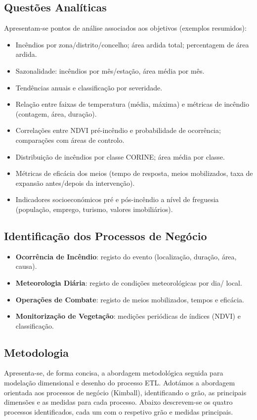 \subsection{Questões Analíticas}
Apresentam-se pontos de análise associados aos objetivos (exemplos resumidos):
\begin{itemize}
	\item Incêndios por zona/distrito/concelho; área ardida total; percentagem de área ardida.
	\item Sazonalidade: incêndios por mês/estação, área média por mês.
	\item Tendências anuais e classificação por severidade.
	\item Relação entre faixas de temperatura (média, máxima) e métricas de incêndio (contagem, área, duração).
	\item Correlações entre NDVI pré-incêndio e probabilidade de ocorrência; comparações com áreas de controlo.
	\item Distribuição de incêndios por classe CORINE; área média por classe.
	\item Métricas de eficácia dos meios (tempo de resposta, meios mobilizados, taxa de expansão antes/depois da intervenção).
	\item Indicadores socioeconómicos pré e pós-incêndio a nível de freguesia (população, emprego, turismo, valores imobiliários).
\end{itemize}

\subsection{Identificação dos Processos de Negócio}
\begin{itemize}
	\item \textbf{Ocorrência de Incêndio}: registo do evento (localização, duração, área, causa).
	\item \textbf{Meteorologia Diária}: registo de condições meteorológicas por dia/ local.
	\item \textbf{Operações de Combate}: registo de meios mobilizados, tempos e eficácia.
	\item \textbf{Monitorização de Vegetação}: medições periódicas de índices (NDVI) e classificação.
\end{itemize}
\subsection{Metodologia}
Apresenta-se, de forma concisa, a abordagem metodológica seguida para modelação dimensional e desenho do processo ETL. Adotámos a abordagem orientada aos processos de negócio (Kimball), identificando o grão, as principais dimensões e as medidas para cada processo. Abaixo descrevem-se os quatro processos identificados, cada um com o respetivo grão e medidas principais.

